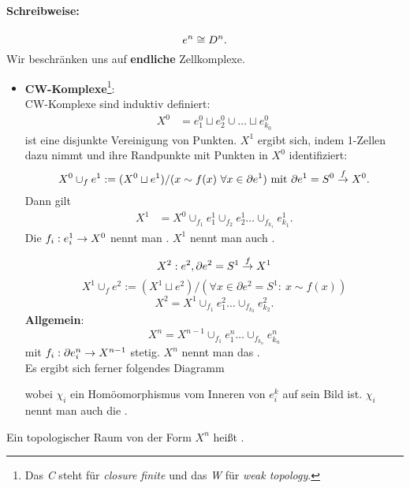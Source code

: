 \paragraph{Schreibweise:}
\[ e^n \overset{}{\cong}D^n. \]
Wir beschränken uns auf \textbf{endliche} Zellkomplexe.
\begin{itemize}
	\item \textbf{CW-Komplexe}\footnote{Das \emph{C} steht für \emph{closure finite} und das \emph{W} für \emph{weak topology}.}:\\
	CW-Komplexe sind induktiv definiert:
	\begin{align*}
	X^0 &= e_1^0 \sqcup e_2^0 \cup \ldots \sqcup e_{k_0}^0 
	\end{align*}
	ist eine disjunkte Vereinigung von Punkten.
	$X^1$ ergibt sich, indem 1-Zellen dazu nimmt und ihre Randpunkte mit Punkten in $X^0$ identifiziert:
	\[ X^0 \cup_f e^1 := (X^0 \sqcup e^1)/( x\sim f(x)~\forall x \in \partial e^1) \text{ mit }\partial e^1 = S^0 \overset{f}{\rightarrow} X^0. \]
	Dann gilt
	\begin{align*}
	X^1 &= X^0 \cup_{f_1} e_1^1
	\cup_{f_2} e_2^1 \ldots
	\cup_{f_{k_1}} e_{k_1}^1.
	\end{align*}
	Die $f_i : e_i^1 \overset{}{\rightarrow} X^0$ nennt man . $X^1$ nennt man auch .
	
	\[ X^2 : e^2, \partial e^2 = S^1 \overset{f}{\rightarrow} X^1 \]
	\[ X^1 \cup_f e^2 := (X^1 \sqcup e^2) / (\forall x \in \partial e^2 = S^1: ~x\sim f(x)) \]
	\[ X^2 = X^1 \cup_{f_1} e^2_1 \ldots \cup_{f_{k_2}}e_{k_2}^2. \]
	 \textbf{Allgemein}:
	\[ X^n = X^{n-1} \cup_{f_1} e^n_1 \ldots \cup_{f_{k_n}} e_{k_n}^n \]
	mit $f_i : \partial e_i^n \overset{}{\rightarrow} X^{n-1}$ stetig. $X^n$ nennt man das .\\
	Es ergibt sich ferner folgendes Diagramm
	\begin{center}
	\end{center}
wobei $\chi_i$ ein Homöomorphismus vom Inneren von $e_i^k$ auf sein Bild ist. $\chi_i$ nennt man auch die .
\end{itemize}

\Def{}
Ein topologischer Raum von der Form $X^n$ heißt .

